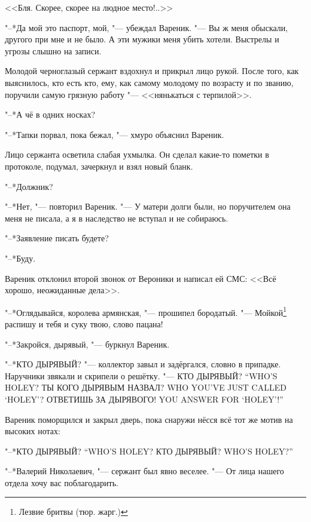<<Бля.
Скорее, скорее на людное место!..>>

\asterism

"--*Да мой это паспорт, мой, "--- убеждал Вареник.
"--- Вы ж меня обыскали, другого при мне и не было.
А эти мужики меня убить хотели.
Выстрелы и угрозы слышно на записи.

Молодой черноглазый сержант вздохнул и прикрыл лицо рукой.
После того, как выяснилось, кто есть кто, ему, как самому молодому по возрасту и по званию, поручили самую грязную работу "--- <<нянькаться с терпилой>>.

"--*А чё в одних носках?

"--*Тапки порвал, пока бежал, "--- хмуро объяснил Вареник.

Лицо сержанта осветила слабая ухмылка.
Он сделал какие-то пометки в протоколе, подумал, зачеркнул и взял новый бланк.

"--*Должник?

"--*Нет, "--- повторил Вареник.
"--- У матери долги были, но поручителем она меня не писала, а я в наследство не вступал и не собираюсь.

"--*Заявление писать будете?

"--*Буду.

\asterism

Вареник отклонил второй звонок от Вероники и написал ей СМС:
<<Всё хорошо, неожиданные дела>>.

\textspace

"--*Оглядывайся, королева армянская, "--- прошипел бородатый.
"--- Мойкой\footnote{Лезвие бритвы (тюр. жарг.)} распишу и тебя и суку твою, слово пацана!

"--*Закройся, дырявый, "--- буркнул Вареник.

"--*КТО ДЫРЯВЫЙ? "--- коллектор завыл и задёргался, словно в припадке.
Наручники звякали и скрипели о решётку.
{"--- КТО ДЫРЯВЫЙ?}
{``WHO'S HOLEY?}
{ТЫ КОГО ДЫРЯВЫМ НАЗВАЛ?}
{WHO YOU'VE JUST CALLED `HOLEY'?}
{ОТВЕТИШЬ ЗА ДЫРЯВОГО!}
{YOU ANSWER FOR `HOLEY'!''}

\textspace

Вареник поморщился и закрыл дверь, пока снаружи нёсся всё тот же мотив на высоких нотах:

{"--*КТО ДЫРЯВЫЙ?}
{``WHO'S HOLEY?}
{КТО ДЫРЯВЫЙ?}
{WHO'S HOLEY?''}

\asterism

\textspace

"--*Валерий Николаевич, "--- сержант был явно веселее.
"--- От лица нашего отдела хочу вас поблагодарить.

